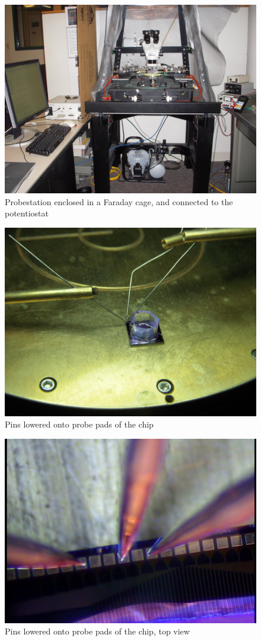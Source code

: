 \begin{figure}
	\centering
	\includegraphics[width=0.5\linewidth]{figures/probestation.png}
	\caption[Probestation]{Probestation enclosed in a Faraday cage, and connected to the potentiostat}
	\label{probestation}
\end{figure}

\begin{figure}
	\centering
	\includegraphics[width=0.5\linewidth]{figures/chippins.png}
	\caption{Pins lowered onto probe pads of the chip}
	\label{chippins}
\end{figure}

\begin{figure}
	\centering
	\includegraphics[width=0.5\linewidth]{figures/chippins-top.png}
	\caption{Pins lowered onto probe pads of the chip, top view}
	\label{chippins-top}
\end{figure}

